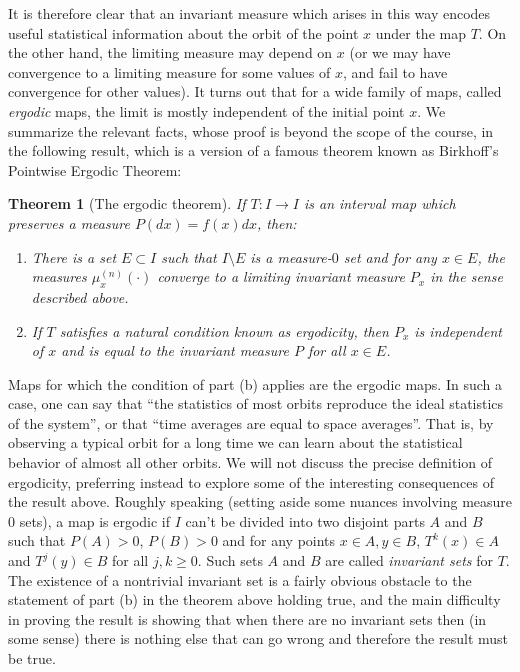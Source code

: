\documentclass[12pt]{amsart}
\newtheorem{thm}{Theorem}
\begin{document}
It is therefore clear that an invariant measure which arises in this way encodes useful statistical information about the orbit of the point $x$ under the map $T$. On the other hand, the limiting measure may depend on $x$ (or we may have convergence to a limiting measure for some values of $x$, and fail to have convergence for other values). It turns out that for a wide family of maps, called \emph{ergodic} maps, the limit is mostly independent of the initial point $x$. We summarize the relevant facts, whose proof is beyond the scope of the course, in the following result, which is a version of a famous theorem known as Birkhoff's Pointwise Ergodic Theorem:

\begin{thm}[The ergodic theorem] If $T:I\to I$ is an interval map which preserves a measure $P(dx)=f(x)dx$, then:
\begin{enumerate}
\item There is a set $E\subset I$ such that $I\setminus E$ is a measure-$0$ set and for any $x\in E$, the measures $\mu_x^{(n)}(\cdot)$ converge to a limiting invariant measure $P_x$ in the sense described above.
\item If $T$ satisfies a natural condition known as ergodicity, then $P_x$ is independent of $x$ and is equal to the invariant measure $P$ for all $x\in E$.
\end{enumerate}
\end{thm}

Maps for which the condition of part (b) applies are the ergodic maps. In such a case, one can say that ``the statistics of most orbits reproduce the ideal statistics of the system'', or that ``time averages are equal to space averages''. That is, by observing a typical orbit for a long time we can learn about the statistical behavior of almost all other orbits. We will not discuss the precise definition of ergodicity, preferring instead to explore some of the interesting consequences of the result above. Roughly speaking (setting aside some nuances involving measure 0 sets), a map is ergodic if $I$ can't be divided into two disjoint parts $A$ and $B$ such that $P(A)>0$, $P(B)>0$ and for any points $x\in A, y\in B$, $T^k(x)\in A$ and $T^j(y) \in B$ for all $j,k\ge 0$. Such sets $A$ and $B$ are called \emph{invariant sets} for $T$. The existence of a nontrivial invariant set is a fairly obvious obstacle to the statement of part (b) in the theorem above holding true, and the main difficulty in proving the result is showing that when there are no invariant sets then (in some sense) there is nothing else that can go wrong and therefore the result must be true.
\end{document}

